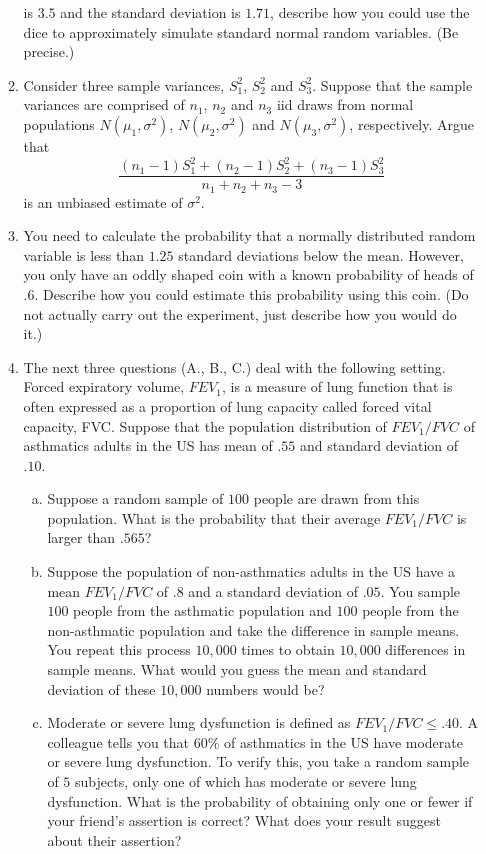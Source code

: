 \documentclass[12pt]{article}
\begin{document}
\begin{enumerate}[1.]
\begin{enumerate}[1.]
  is $3.5$ and the standard deviation is $1.71$, describe how you 
  could use the dice to approximately simulate standard normal random variables. (Be precise.)
\item Consider three sample variances, $S_1^2$, $S_2^2$ and
  $S_3^2$. Suppose that the sample variances are comprised of $n_1$,
  $n_2$ and $n_3$ iid draws from normal populations $N(\mu_1,
  \sigma^2)$, $N(\mu_2, \sigma^2)$ and $N(\mu_3, \sigma^2)$, respectively. Argue
  that $$\frac{(n_1 - 1)S_1^2 + (n_2 - 1)S_2^2 + (n_3 - 1) S_3^2}{n_1
    + n_2 + n_3 - 3}$$ is an unbiased estimate of $\sigma^2$.
\item You need to calculate the probability that a normally
  distributed random variable is less than $1.25$ standard deviations
  below the mean. However, you only have an oddly shaped coin with a
  known probability of heads of $.6$. Describe how you could estimate
  this probability using this coin. (Do not actually carry out the
  experiment, just describe how you would do it.)
\item The next three questions (A., B., C.) deal with the following
  setting. Forced expiratory volume, $FEV_1$, is a measure of lung
  function that is often expressed as a proportion of lung capacity
  called forced vital capacity, FVC.  Suppose that the population
  distribution of $FEV_1/FVC$ of asthmatics adults in the US has mean
  of $.55$ and standard deviation of $.10$.
\begin{enumerate}[a.]
\item Suppose a random sample of $100$ people are drawn from this
  population. What is the probability that their average $FEV_1/FVC$ is
  larger than $.565$?
\item Suppose the population of non-asthmatics adults in the US have
  a mean $FEV_1/FVC$ of $.8$ and a standard deviation of $.05$.
  You sample $100$ people from the asthmatic population and
  $100$ people from the non-asthmatic population and take the
  difference in sample means. You repeat this process $10,000$
  times to obtain $10,000$ differences in sample means. What
  would you guess the mean and standard deviation of these
  $10,000$ numbers would be?
\item Moderate or severe lung dysfunction is defined as $FEV_1/FVC
  \leq .40$. A colleague tells you that $60\%$ of asthmatics
  in the US have moderate or severe lung dysfunction. To verify this,
  you take a random sample of $5$ subjects, only one of which has
  moderate or severe lung dysfunction. What is the probability of
  obtaining only one or fewer if your friend's assertion is
  correct? What does your result suggest about their
  assertion? 
\end{enumerate}


\end{enumerate}
\end{enumerate}
\end{document}
